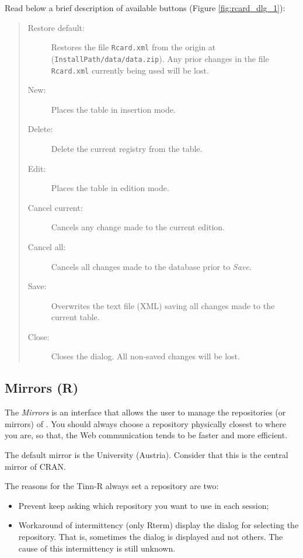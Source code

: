 Read below a brief description of available buttons (Figure \ref{fig:rcard_dlg_1}):

\begin{quote}
  \begin{footnotesize}
    \begin{description}
      \item[Restore default:]
        Restores the file \texttt{Rcard.xml} from the origin at
        (\texttt{InstallPath/data/data.zip}). Any prior changes in the
        file \texttt{Rcard.xml} currently being used will be lost.
      \item[New:]
        Places the table in insertion mode.
      \item[Delete:]
        Delete the current registry from the table.
      \item[Edit:]
        Places the table in edition mode.
      \item[Cancel current:]
        Cancels any change made to the current edition.
      \item[Cancel all:]
        Cancels all changes made to the database prior to \textit{Save}.
      \item[Save:]
        Overwrites the text file (XML) saving all changes made to the current table.
      \item[Close:]
        Closes the dialog. All non-saved changes will be lost.
    \end{description}
  \end{footnotesize}
\end{quote}


\subsection{Mirrors (R)}

The \textit{Mirrors} is an interface that allows the user to manage the repositories (or mirrors) of \RR{}.
You should always choose a repository physically closest to where you are,
so that, the Web communication tends to be faster and more efficient.

The default mirror is the University 
(Austria). Consider that this is the central mirror of CRAN.

The reasons for the Tinn-R always set a repository are two:
\begin {itemize}
   \item Prevent \RR{} keep asking which repository you want to use in each session;
   \item Workaround of intermittency (only Rterm) display the dialog for selecting the repository.
    That is, sometimes the dialog is displayed and not others. The cause of this intermittency is still unknown.
\end {itemize}

